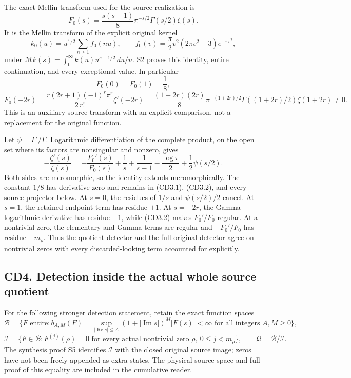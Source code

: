 \documentclass[
]{article}
\begin{document}
The exact Mellin transform used for the source realization is \[
F_0(s)=\frac{s(s-1)}8\pi^{-s/2}\Gamma(s/2)\zeta(s).
\tag{CD3.1}
\] It is the Mellin transform of the explicit original kernel \[
k_0(u)=u^{1/2}\sum_{n\ge1}f_0(nu),\qquad
f_0(v)=\frac\pi2v^2(2\pi v^2-3)e^{-\pi v^2},
\] under \(\mathcal Mk(s)=\int_0^\infty k(u)u^{s-1/2}\,du/u\). S2 proves
this identity, entire continuation, and every exceptional value. In
particular \[
F_0(0)=F_0(1)=\frac18,
\] \[
F_0(-2r)=\frac{r(2r+1)(-1)^r\pi^r}{2\,r!}\zeta'(-2r)
=\frac{(1+2r)(2r)}8\pi^{-(1+2r)/2}
\Gamma((1+2r)/2)\zeta(1+2r)\ne0.
\tag{CD3.2}
\] This is an auxiliary source transform with an explicit comparison,
not a replacement for the original function.

Let \(\psi=\Gamma'/\Gamma\). Logarithmic differentiation of the complete
product, on the open set where its factors are nonsingular and nonzero,
gives \[
\boxed{
-\frac{\zeta'(s)}{\zeta(s)}
=-\frac{F_0'(s)}{F_0(s)}
+\frac1s+\frac1{s-1}
-\frac{\log\pi}{2}+\frac12\psi(s/2).}
\tag{CD3.3}
\] Both sides are meromorphic, so the identity extends meromorphically.
The constant \(1/8\) has derivative zero and remains in (CD3.1),
(CD3.2), and every source projector below. At \(s=0\), the residues of
\(1/s\) and \(\psi(s/2)/2\) cancel. At \(s=1\), the retained endpoint
term has residue \(+1\). At \(s=-2r\), the Gamma logarithmic derivative
has residue \(-1\), while (CD3.2) makes \(F_0'/F_0\) regular. At a
nontrivial zero, the elementary and Gamma terms are regular and
\(-F_0'/F_0\) has residue \(-m_\rho\). Thus the quotient detector and
the full original detector agree on nontrivial zeros with every
discarded-looking term accounted for explicitly.

\subsection{CD4. Detection inside the actual whole source
quotient}\label{cd4.-detection-inside-the-actual-whole-source-quotient}

For the following stronger detection statement, retain the exact
function spaces \[
\mathcal B=\{F\text{ entire}:b_{A,M}(F)=
\sup_{|\operatorname{Re}s|\le A}(1+|\operatorname{Im}s|)^M|F(s)|<\infty
\text{ for all integers }A,M\ge0\},
\] \[
\mathcal I=\{F\in\mathcal B:F^{(j)}(\rho)=0
\text{ for every actual nontrivial zero }\rho,\ 0\le j<m_\rho\},
\qquad \mathcal Q=\mathcal B/\mathcal I.
\tag{CD4.1}
\] The synthesis proof S5 identifies \(\mathcal I\) with the closed
original source image; zeros have not been freely appended as extra
states. The physical source space and full proof of this equality are
included in the cumulative reader.
\end{document}
